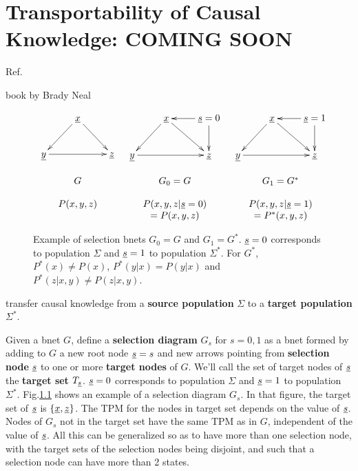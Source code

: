 \chapter{Transportability
of Causal Knowledge: COMING SOON}
\label{ch-transport}





Ref.\cite{pearl2011trans}

book by Brady Neal \cite{book-brady-neal}


\begin{figure}[h!]
$$
\begin{array}{ccc}
\xymatrix{
&\rvx\ar[dl]\ar[dr]
\\
\rvy\ar[rr]
&&\rvz
}
&
\xymatrix{
&\rvx\ar[dl]\ar[dr]
&\rvs=0\ar[l]\ar[d]
\\
\rvy\ar[rr]
&&\rvz
}
&
\xymatrix{
&\rvx\ar[dl]\ar[dr]
&\rvs=1\ar[l]\ar[d]
\\
\rvy\ar[rr]
&&\rvz
}
\\
\\
G&G_0=G
&G_1=G^*
\\
\\
P(x,y,z)
&P(x,y,z|\rvs=0)
&P(x,y,z|\rvs=1)
\\
&
=P(x,y,z)
&
=P^*(x,y,z)
\end{array}
$$
\caption{Example of selection bnets
$G_0=G$ and $G_1=G^*$.
${\underline{s}}=0$ corresponds to population $\Sigma$
and ${\underline{s}}=1$ to population $\Sigma^*$.
For $G^*$, 
$P^*(x)\neq P(x)$, $P^*(y|x)=P(y|x)$
and $P^*(z|x,y)\neq P(z|x,y)$.}
\label{fig-sel-dia}
\end{figure}


transfer causal knowledge from
a {\bf source population} $\Sigma$ to a 
{\bf target population} $\Sigma^*$.

Given a bnet $G$, define a
{\bf selection diagram} $G_s$ for $s=0,1$
as a bnet 
formed by adding to $G$ a new root node ${\underline{s}}=s$
and new arrows pointing
from {\bf selection node}
${\underline{s}}$ to one
or more {\bf target nodes} of $G$.
We'll call the set 
of target nodes 
of ${\underline{s}}$ the {\bf target set} $T_{\underline{s}}$.
${\underline{s}}=0$ corresponds to population $\Sigma$
and ${\underline{s}}=1$ to population $\Sigma^*$.
Fig.\ref{fig-sel-dia}
shows an example
of a selection diagram $G_s$.
In that figure, the target set 
of ${\underline{s}}$ is 
$\{{\underline{x}}, {\underline{z}}\}$.
The TPM for the nodes in target set 
depends on the value of ${\underline{s}}$.
Nodes of $G_s$ not in
the target set have the same TPM as in $G$,
independent of the value of ${\underline{s}}$.
All this can be generalized so as to 
have more than one selection node,
with the target sets
of the selection nodes being disjoint, and such that a
selection node
can have more than 2 states.


